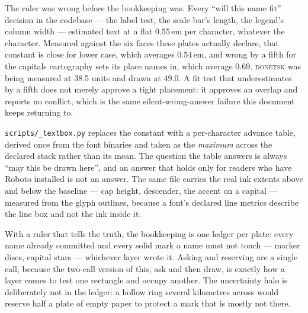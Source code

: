 \documentclass[11pt]{article}
\begin{document}
The ruler was wrong before the bookkeeping was. Every ``will this name
fit'' decision in the codebase --- the label test, the scale bar's
length, the legend's column width --- estimated text at a flat
$0.55\,\mathrm{em}$ per character, whatever the character. Measured
against the six faces these plates actually declare, that constant is
close for lower case, which averages $0.54\,\mathrm{em}$, and wrong by a
fifth for the capitals cartography sets its place names in, which average
$0.69$. \textsc{donetsk} was being measured at 38.5 units and drawn at
49.0. A fit test that underestimates by a fifth does not merely approve a
tight placement: it approves an overlap and reports no conflict, which is
the same silent-wrong-answer failure this document keeps returning to.

\texttt{scripts/\_textbox.py} replaces the constant with a per-character
advance table, derived once from the font binaries and taken as the
\emph{maximum} across the declared stack rather than its mean. The
question the table answers is always ``may this be drawn here'', and an
answer that holds only for readers who have Roboto installed is not an
answer. The same file carries the real ink extents above and below the
baseline --- cap height, descender, the accent on a capital --- measured
from the glyph outlines, because a font's declared line metrics describe
the line box and not the ink inside it.

With a ruler that tells the truth, the bookkeeping is one ledger per
plate: every name already committed and every solid mark a name must not
touch --- marker discs, capital stars --- whichever layer wrote it.
Asking and reserving are a single call, because the two-call version of
this, ask and then draw, is exactly how a layer comes to test one
rectangle and occupy another. The uncertainty halo is deliberately not in
the ledger: a hollow ring several kilometres across would reserve half a
plate of empty paper to protect a mark that is mostly not there.
\end{document}
